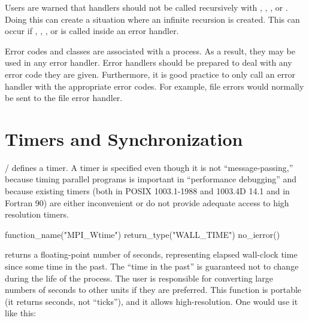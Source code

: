 \begin{users}
\begin{sloppy}
Users are warned that handlers should not be called recursively with
,
,
, or
.  Doing
this can create a situation where an infinite recursion is created.
This can occur if ,
,
, or
 is called
inside an error handler.

\end{sloppy}

Error codes and classes are associated with a process.  As a result,
they may be used in any error handler.  Error handlers should be
prepared to deal with any error code 
they are 
given.  Furthermore, it is
good practice to only call an error handler with the appropriate
error codes.  For example, file errors would normally be sent to the
file error 
handler.
\end{users}
 

\section{Timers and Synchronization}
\label{sec:timers}
\MPI/ defines a timer.  A timer is specified even though it is not
``message-passing,'' because timing parallel programs is important in
``performance debugging'' and because existing timers (both in POSIX
1003.1-1988 and 1003.4D 14.1 and in Fortran 90) are either inconvenient or do
not provide adequate access to high resolution timers.

\begin{mpi-binding}
    function_name("MPI_Wtime")
    return_type("WALL_TIME")
    no_ierror()
\end{mpi-binding}

 returns a floating-point number of seconds,
representing elapsed wall-clock time since some time in
the past.
%
The ``time in the past'' is guaranteed not to change during the life of the
process.  The user is responsible for converting large numbers of seconds to
other units if they are preferred.
%
This function is portable (it returns seconds, not ``ticks''), and it allows
high-resolution.  One would use it like this:

